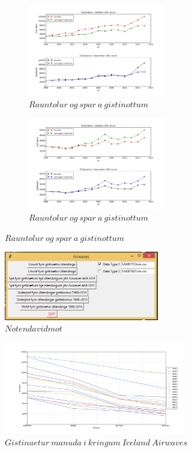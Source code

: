 \documentclass[11pt,a4paper]{amsart}
\theoremstyle{plain}
\theoremstyle{definition}
\theoremstyle{remark}
\begin{document}
\begin{figure}[H]
	\centering
	\begin{subfigure}[b]{0.45\textwidth}
		\includegraphics[height=40mm]{figure_3.png}
		\caption{$ Rauntolur\ og\ spar\ a\ gistinottum $\label{fig:mynd4}}
	\end{subfigure}
	\begin{subfigure}[b]{0.45\textwidth}
		\includegraphics[height=40mm]{figure_2.png}
		\caption{$ Rauntolur\ og\ spar\ a\ gistinottum $\label{fig:gist_spa}}
	\end{subfigure}
\end{figure}

\begin{figure}[H]
\centering
\includegraphics[height=30mm]{GUI.png}
\caption{$ Notendavidmot $\label{fig:noten}}
\end{figure}

\begin{figure}[H]
\centering
\includegraphics[height=40mm]{my_plot.png}
\caption{$ Gistinaetur\ manuda\ i\ kringum\ Iceland\ Airwaves $\label{fig:gist_hlutf}}
\end{figure}
	
{}

\end{document}
